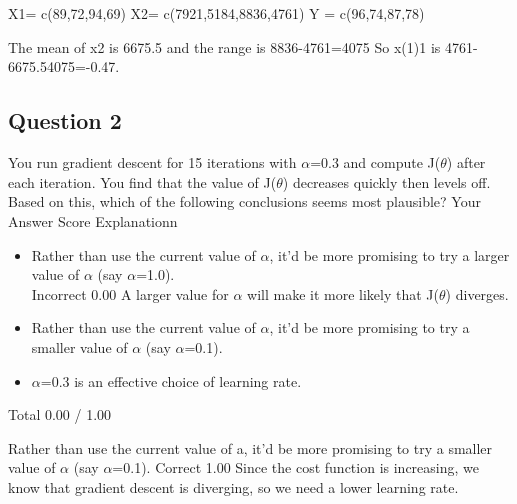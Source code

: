 \documentclass[]{article}
\title{}
\author{}
\begin{document}

\begin{abstract}

\end{abstract}

\section{}

X1= c(89,72,94,69)
X2= c(7921,5184,8836,4761)
Y = c(96,74,87,78)



The mean of x2 is 6675.5 and the range is 8836-4761=4075 So x(1)1 is 4761-6675.54075=-0.47.

\subsection*{Question 2}
You run gradient descent for 15 iterations with $\alpha$=0.3 and compute J($\theta$) after each iteration. 
You find that the value of J($\theta$) decreases quickly then levels off. Based on this, which of the following conclusions seems most plausible?
Your Answer		Score	Explanationn
\begin{itemize}
\item Rather than use the current value of $\alpha$, it'd be more promising to try a larger value of $\alpha$ (say $\alpha$=1.0).
\\ Incorrect	0.00	 A larger value for $\alpha$ will make it more likely that J($\theta$) diverges.
\item Rather than use the current value of $\alpha$, it'd be more promising to try a smaller value of $\alpha$ (say $\alpha$=0.1).			
\item $\alpha$=0.3 is an effective choice of learning rate.			
\end{itemize}
Total		0.00 / 1.00	

 Rather than use the current value of a, it'd be more promising to try a smaller value of $\alpha$ (say $\alpha$=0.1).	Correct	1.00	 
Since the cost function is increasing, we know that gradient descent is diverging, so we need a lower learning rate.
\end{document}
